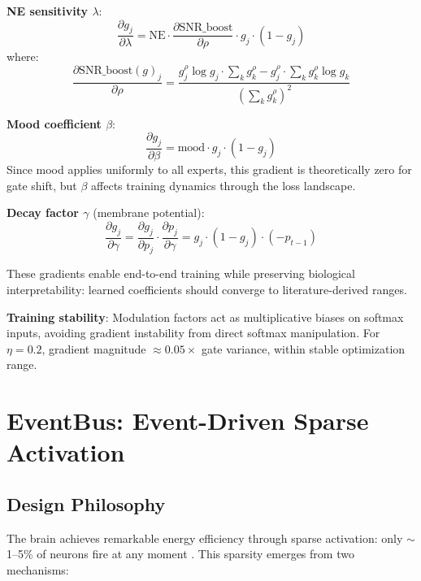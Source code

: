 \documentclass[preprint,12pt]{elsarticle}
\begin{document}
\textbf{NE sensitivity $\lambda$}:
\begin{equation}
\frac{\partial g_j}{\partial \lambda} = \text{NE} \cdot \frac{\partial \text{SNR\_boost}}{\partial \rho} \cdot g_j \cdot (1 - g_j)
\end{equation}
where:
\begin{equation}
\frac{\partial \text{SNR\_boost}(g)_j}{\partial \rho} = \frac{g_j^\rho \log g_j \cdot \sum_k g_k^\rho - g_j^\rho \cdot \sum_k g_k^\rho \log g_k}{(\sum_k g_k^\rho)^2}
\end{equation}

\textbf{Mood coefficient $\beta$}:
\begin{equation}
\frac{\partial g_j}{\partial \beta} = \text{mood} \cdot g_j \cdot (1 - g_j)
\end{equation}
Since mood applies uniformly to all experts, this gradient is theoretically zero for gate shift, but $\beta$ affects training dynamics through the loss landscape.

\textbf{Decay factor $\gamma$} (membrane potential):
\begin{equation}
\frac{\partial g_j}{\partial \gamma} = \frac{\partial g_j}{\partial p_j} \cdot \frac{\partial p_j}{\partial \gamma} = g_j \cdot (1 - g_j) \cdot (-p_{t-1})
\end{equation}

These gradients enable end-to-end training while preserving biological interpretability: learned coefficients should converge to literature-derived ranges.

\textbf{Training stability}: Modulation factors act as multiplicative biases on softmax inputs, avoiding gradient instability from direct softmax manipulation. For $\eta=0.2$, gradient magnitude $\approx 0.05 \times$ gate variance, within stable optimization range.

\section{EventBus: Event-Driven Sparse Activation}
\label{sec:eventbus}

\subsection{Design Philosophy}

The brain achieves remarkable energy efficiency through sparse activation: only $\sim$1--5\% of neurons fire at any moment \cite{lennie2003}. This sparsity emerges from two mechanisms:
\end{document}
